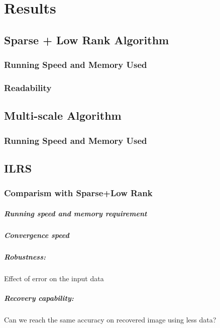 \chapter{Results}

\section{Sparse + Low Rank Algorithm}
\subsection{Running Speed and Memory Used}
\subsection{Readability}

\section{Multi-scale Algorithm}
\subsection{Running Speed and Memory Used}

\section{ILRS}
\subsection{Comparism with Sparse+Low Rank}
\paragraph{Running speed and memory requirement}
\paragraph{Convergence speed}
\paragraph{Robustness:} Effect of error on the input data
\paragraph{Recovery capability:} Can we reach the same accuracy on recovered image using less data?

